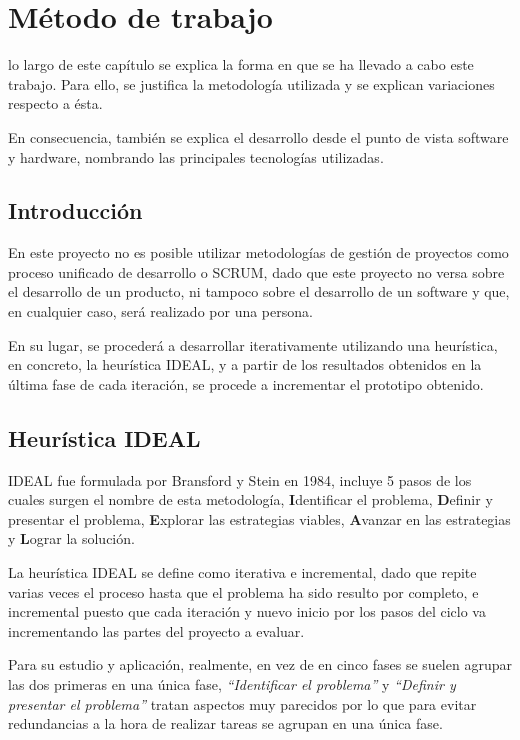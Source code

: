 \chapter{Método de trabajo}
\label{chap:metodo}

 lo largo de este capítulo se explica la forma en que se ha llevado a cabo este trabajo. Para ello, se justifica la metodología utilizada y se explican variaciones respecto a ésta.

En consecuencia, también se explica el desarrollo desde el punto de vista software y hardware, nombrando las principales tecnologías utilizadas.

\section{Introducción}

En este proyecto no es posible utilizar metodologías de gestión de proyectos como proceso unificado de desarrollo o SCRUM\cite{SCRUM}, dado que este proyecto no versa sobre el desarrollo de un producto, ni tampoco sobre el desarrollo de un software y que, en cualquier caso, será realizado por una persona.

En su lugar, se procederá a desarrollar iterativamente utilizando una heurística, en concreto, la heurística IDEAL, y a partir de los resultados obtenidos en la última fase de cada iteración, se procede a incrementar el prototipo obtenido.

\section{Heurística IDEAL}

IDEAL fue formulada por Bransford y Stein en 1984\cite{Brans93}, incluye 5 pasos de los cuales surgen el nombre de esta metodología, \textbf{I}dentificar el problema, \textbf{D}efinir y presentar el problema, \textbf{E}xplorar las estrategias viables, \textbf{A}vanzar en las estrategias y \textbf{L}ograr la solución.

La heurística IDEAL se define como iterativa e incremental, dado que repite varias veces el proceso hasta que el problema ha sido resulto por completo, e incremental puesto que cada iteración y nuevo inicio por los pasos del ciclo va incrementando las partes del proyecto a evaluar.

Para su estudio y aplicación, realmente, en vez de en cinco fases se suelen agrupar las dos primeras en una única fase\cite{Perales94}, \textit{``Identificar el problema''} y \textit{``Definir y presentar el problema''} tratan aspectos muy parecidos por lo que para evitar redundancias a la hora de realizar tareas se agrupan en una única fase.

